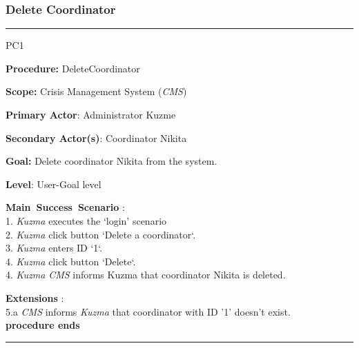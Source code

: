 \subsubsection{Delete Coordinator}
\vspace{0.5cm}
\hrule
\begin{lyxlist}{PC1}
\small{
\item [\textbf{Procedure:}] DeleteCoordinator
\item [\textbf{Scope:}] Crisis Management System (\emph{CMS})
\item [\textbf{Primary Actor}:] Administrator Kuzme
\item [\textbf{Secondary Actor(s)}:] Coordinator Nikita
\item [\textbf{Goal:}] Delete coordinator Nikita from the system.
\item [\textbf{Level}:] User-Goal level
\item [\textbf{Main~Success~Scenario}]:\\
1. \emph{Kuzma} executes the `login' scenario\\
2. \emph{Kuzma} click button `Delete a coordinator`.\\
3. \emph{Kuzma} enters ID `1`. \\
4. \emph{Kuzma} click button `Delete`. \\
4. \emph{Kuzma} \emph{CMS} informs Kuzma that coordinator Nikita is deleted. 
\item [\textbf{Extensions}]:\\
5.a \emph{CMS} informs \emph{Kuzma} that coordinator with ID '1' doesn't
exist.\\ \hspace*{0.5cm} \textbf{procedure ends}
}
\end{lyxlist}
\hrule
\vspace{0.5cm}


